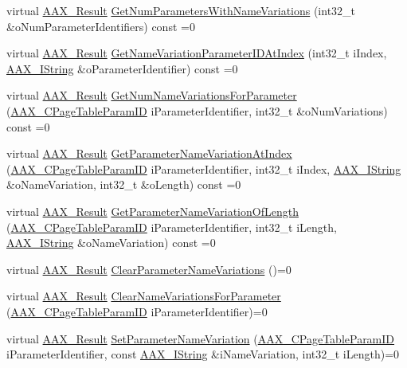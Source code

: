 \begin{DoxyCompactItemize}
virtual \mbox{\hyperlink{a00392_a4d8f69a697df7f70c3a8e9b8ee130d2f}{A\+A\+X\+\_\+\+Result}} \mbox{\hyperlink{a01849_ad186d2870ad5c188a7375080e8a7907b}{Get\+Num\+Parameters\+With\+Name\+Variations}} (int32\+\_\+t \&o\+Num\+Parameter\+Identifiers) const =0
\item 
virtual \mbox{\hyperlink{a00392_a4d8f69a697df7f70c3a8e9b8ee130d2f}{A\+A\+X\+\_\+\+Result}} \mbox{\hyperlink{a01849_ac505024dd195c1965c54acac8f1f3016}{Get\+Name\+Variation\+Parameter\+I\+D\+At\+Index}} (int32\+\_\+t i\+Index, \mbox{\hyperlink{a01873}{A\+A\+X\+\_\+\+I\+String}} \&o\+Parameter\+Identifier) const =0
\item 
virtual \mbox{\hyperlink{a00392_a4d8f69a697df7f70c3a8e9b8ee130d2f}{A\+A\+X\+\_\+\+Result}} \mbox{\hyperlink{a01849_af8be797a3ec7ed3117e720dd29ea7cc7}{Get\+Num\+Name\+Variations\+For\+Parameter}} (\mbox{\hyperlink{a00392_ab4e01b971dac1b25632fd9f710dd8f77}{A\+A\+X\+\_\+\+C\+Page\+Table\+Param\+ID}} i\+Parameter\+Identifier, int32\+\_\+t \&o\+Num\+Variations) const =0
\item 
virtual \mbox{\hyperlink{a00392_a4d8f69a697df7f70c3a8e9b8ee130d2f}{A\+A\+X\+\_\+\+Result}} \mbox{\hyperlink{a01849_adffe5a5f2ad548bd4c704508d816d568}{Get\+Parameter\+Name\+Variation\+At\+Index}} (\mbox{\hyperlink{a00392_ab4e01b971dac1b25632fd9f710dd8f77}{A\+A\+X\+\_\+\+C\+Page\+Table\+Param\+ID}} i\+Parameter\+Identifier, int32\+\_\+t i\+Index, \mbox{\hyperlink{a01873}{A\+A\+X\+\_\+\+I\+String}} \&o\+Name\+Variation, int32\+\_\+t \&o\+Length) const =0
\item 
virtual \mbox{\hyperlink{a00392_a4d8f69a697df7f70c3a8e9b8ee130d2f}{A\+A\+X\+\_\+\+Result}} \mbox{\hyperlink{a01849_a6ddd61f6ba18b8be8141363d5234ed9d}{Get\+Parameter\+Name\+Variation\+Of\+Length}} (\mbox{\hyperlink{a00392_ab4e01b971dac1b25632fd9f710dd8f77}{A\+A\+X\+\_\+\+C\+Page\+Table\+Param\+ID}} i\+Parameter\+Identifier, int32\+\_\+t i\+Length, \mbox{\hyperlink{a01873}{A\+A\+X\+\_\+\+I\+String}} \&o\+Name\+Variation) const =0
\item 
virtual \mbox{\hyperlink{a00392_a4d8f69a697df7f70c3a8e9b8ee130d2f}{A\+A\+X\+\_\+\+Result}} \mbox{\hyperlink{a01849_a6af3965eaf2baeadef9a44aa9c77ecbb}{Clear\+Parameter\+Name\+Variations}} ()=0
\item 
virtual \mbox{\hyperlink{a00392_a4d8f69a697df7f70c3a8e9b8ee130d2f}{A\+A\+X\+\_\+\+Result}} \mbox{\hyperlink{a01849_ae6cf05c366d982e8ea92fea1d98f1d22}{Clear\+Name\+Variations\+For\+Parameter}} (\mbox{\hyperlink{a00392_ab4e01b971dac1b25632fd9f710dd8f77}{A\+A\+X\+\_\+\+C\+Page\+Table\+Param\+ID}} i\+Parameter\+Identifier)=0
\item 
virtual \mbox{\hyperlink{a00392_a4d8f69a697df7f70c3a8e9b8ee130d2f}{A\+A\+X\+\_\+\+Result}} \mbox{\hyperlink{a01849_a28643218ca7286f45c4820a020a06bf8}{Set\+Parameter\+Name\+Variation}} (\mbox{\hyperlink{a00392_ab4e01b971dac1b25632fd9f710dd8f77}{A\+A\+X\+\_\+\+C\+Page\+Table\+Param\+ID}} i\+Parameter\+Identifier, const \mbox{\hyperlink{a01873}{A\+A\+X\+\_\+\+I\+String}} \&i\+Name\+Variation, int32\+\_\+t i\+Length)=0
\end{DoxyCompactItemize}


